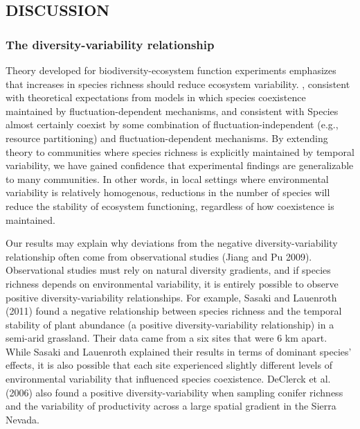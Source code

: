 \documentclass[12pt,]{article}
\begin{document}
\subsection{DISCUSSION}\label{discussion}

\subsubsection{The diversity-variability
relationship}\label{the-diversity-variability-relationship}

Theory developed for biodiversity-ecosystem function experiments
emphasizes that increases in species richness should reduce ecosystem
variability. , consistent with theoretical expectations from models in
which species coexistence maintained by fluctuation-dependent
mechanisms, and consistent with Species almost certainly coexist by some
combination of fluctuation-independent (e.g., resource partitioning) and
fluctuation-dependent mechanisms. By extending theory to communities
where species richness is explicitly maintained by temporal variability,
we have gained confidence that experimental findings are generalizable
to many communities. In other words, in local settings where
environmental variability is relatively homogenous, reductions in the
number of species will reduce the stability of ecosystem functioning,
regardless of how coexistence is maintained.

Our results may explain why deviations from the negative
diversity-variability relationship often come from observational studies
(Jiang and Pu 2009). Observational studies must rely on natural
diversity gradients, and if species richness depends on environmental
variability, it is entirely possible to observe positive
diversity-variability relationships. For example, Sasaki and Lauenroth
(2011) found a negative relationship between species richness and the
temporal stability of plant abundance (a positive diversity-variability
relationship) in a semi-arid grassland. Their data came from a six sites
that were 6 km apart. While Sasaki and Lauenroth explained their results
in terms of dominant species' effects, it is also possible that each
site experienced slightly different levels of environmental variability
that influenced species coexistence. DeClerck et al. (2006) also found a
positive diversity-variability when sampling conifer richness and the
variability of productivity across a large spatial gradient in the
Sierra Nevada.
\end{document}
